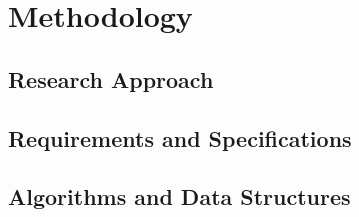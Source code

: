 \chapter{Methodology}
\blindtext%

\section{Research Approach}
\blindtext%

\section{Requirements and Specifications}
\blindtext%

\section{Algorithms and Data Structures}
\blindtext%
